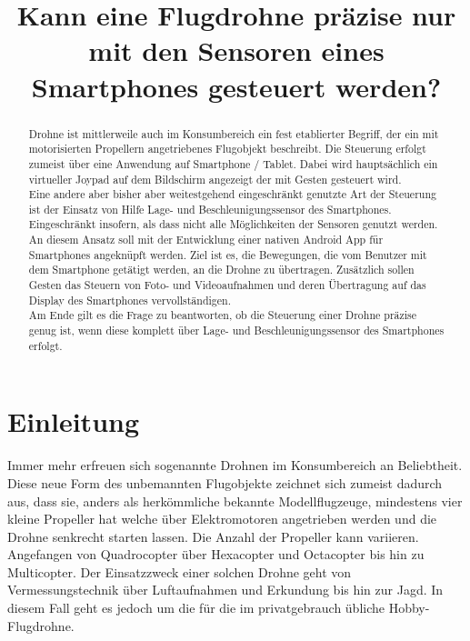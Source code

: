 \documentclass{article}
\title{Kann eine Flugdrohne präzise nur mit den Sensoren eines Smartphones gesteuert werden?}
\begin{document}
\maketitle
\begin{abstract}
Drohne ist mittlerweile auch im Konsumbereich ein fest etablierter Begriff, der ein mit motorisierten Propellern angetriebenes Flugobjekt beschreibt. Die Steuerung erfolgt zumeist über eine Anwendung auf Smartphone / Tablet. Dabei wird hauptsächlich ein virtueller Joypad auf dem Bildschirm angezeigt der mit Gesten gesteuert wird.\\ Eine andere aber bisher aber weitestgehend eingeschränkt genutzte Art der Steuerung ist der Einsatz von Hilfe Lage- und Beschleunigungssensor des Smartphones. Eingeschränkt insofern, als dass nicht alle Möglichkeiten der Sensoren genutzt werden. An diesem Ansatz soll mit der Entwicklung einer nativen Android App für Smartphones angeknüpft werden. Ziel ist es, die Bewegungen, die vom Benutzer mit dem Smartphone getätigt werden, an die Drohne zu übertragen. Zusätzlich sollen Gesten das Steuern von Foto- und Videoaufnahmen und deren Übertragung auf das Display des Smartphones vervollständigen.\\ Am Ende gilt es die Frage zu beantworten, ob die Steuerung einer Drohne präzise genug ist, wenn diese komplett über Lage- und Beschleunigungssensor des Smartphones erfolgt.

\end{abstract}

\section{Einleitung}
\label{sec:einleitung}
Immer mehr erfreuen sich sogenannte Drohnen im Konsumbereich an Beliebtheit. Diese neue Form des unbemannten Flugobjekte zeichnet sich zumeist dadurch aus, dass sie, anders als herkömmliche bekannte Modellflugzeuge, mindestens vier kleine Propeller hat welche über Elektromotoren angetrieben werden und die Drohne senkrecht starten lassen. Die Anzahl der Propeller kann variieren. Angefangen von Quadrocopter über Hexacopter und Octacopter bis hin zu Multicopter. Der Einsatzzweck einer solchen Drohne geht von Vermessungstechnik über Luftaufnahmen und Erkundung bis hin zur Jagd. In diesem Fall geht es jedoch um die für die im privatgebrauch übliche Hobby-Flugdrohne.
\end{document}
